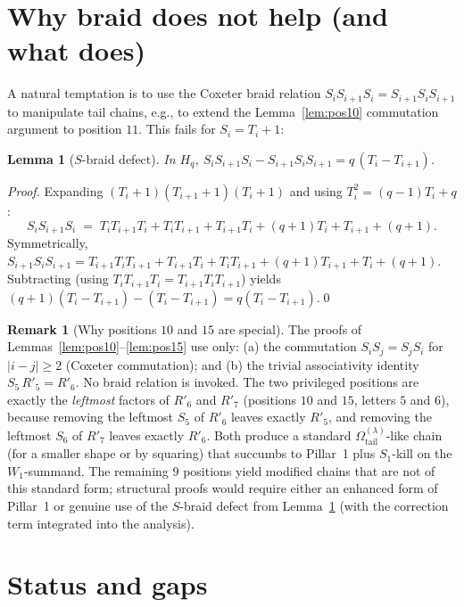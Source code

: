 \documentclass[11pt]{article}
\newtheorem{lemma}[theorem]{Lemma}
\theoremstyle{definition}
\newtheorem{remark}[theorem]{Remark}
\newcommand{\Hq}{H_q}
\newcommand{\Om}{\Omega}
\newcommand{\Omtail}{\Om^{(\lambda)}_{\mathrm{tail}}}
\newcommand{\Rp}{R'}
\begin{document}
\section{Why braid does not help (and what does)}\label{sec:braid}

A natural temptation is to use the Coxeter braid relation $S_i S_{i+1} S_i
= S_{i+1} S_i S_{i+1}$ to manipulate tail chains, e.g., to extend the
Lemma~\ref{lem:pos10} commutation argument to position $11$. This fails for
$S_i = T_i + 1$:

\begin{lemma}[$S$-braid defect]\label{lem:braid-defect}
In $\Hq$, $S_i S_{i+1} S_i - S_{i+1} S_i S_{i+1} = q\,(T_i - T_{i+1})$.
\end{lemma}

\begin{proof}
Expanding $(T_i+1)(T_{i+1}+1)(T_i+1)$ and using $T_i^2 = (q-1)T_i + q$:
\[
   S_i S_{i+1} S_i \;=\; T_i T_{i+1} T_i + T_i T_{i+1} + T_{i+1} T_i + (q+1) T_i + T_{i+1} + (q+1).
\]
Symmetrically,
$S_{i+1} S_i S_{i+1} = T_{i+1} T_i T_{i+1} + T_{i+1} T_i + T_i T_{i+1} + (q+1) T_{i+1} + T_i + (q+1)$.
Subtracting (using $T_i T_{i+1} T_i = T_{i+1} T_i T_{i+1}$) yields
$(q+1)(T_i - T_{i+1}) - (T_i - T_{i+1}) = q(T_i - T_{i+1})$.\qed
\end{proof}

\begin{remark}[Why positions $10$ and $15$ are special]\label{rem:special-positions}
The proofs of Lemmas~\ref{lem:pos10}--\ref{lem:pos15} use only:
(a) the commutation $S_i S_j = S_j S_i$ for $|i - j| \ge 2$ (Coxeter commutation);
and (b) the trivial associativity identity $S_5\, \Rp_5 = \Rp_6$.
No braid relation is invoked. The two privileged positions are exactly the
\emph{leftmost} factors of $\Rp_6$ and $\Rp_7$ (positions $10$ and $15$,
letters $5$ and $6$), because removing the leftmost $S_5$ of $\Rp_6$ leaves
exactly $\Rp_5$, and removing the leftmost $S_6$ of $\Rp_7$ leaves
exactly $\Rp_6$. Both produce a standard $\Omtail$-like chain (for a smaller
shape or by squaring) that succumbs to Pillar~1 plus $S_1$-kill on the
$W_1$-summand. The remaining $9$ positions yield modified chains that are not
of this standard form; structural proofs would require either an enhanced
form of Pillar~1 or genuine use of the $S$-braid defect from
Lemma~\ref{lem:braid-defect} (with the correction term integrated into the
analysis).
\end{remark}

\section{Status and gaps}\label{sec:status}
\end{document}

